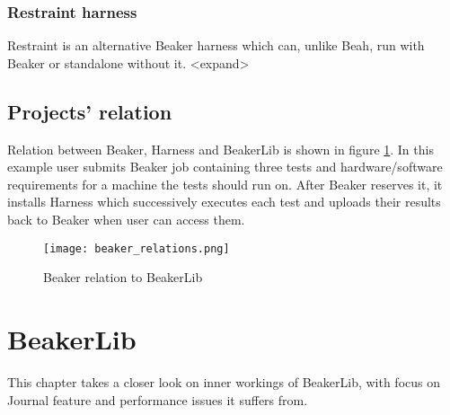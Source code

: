 \subsection{Restraint harness}
Restraint \cite{restraint_doc} is an alternative Beaker harness which can, unlike Beah, run with Beaker or standalone without it. <expand>

\section{Projects' relation}
Relation between Beaker, Harness and BeakerLib is shown in figure \ref{fig:beaker_relation}. In this example user submits Beaker job containing three tests and hardware/software requirements for a machine the tests should run on. After Beaker reserves it, it installs Harness which successively executes each test and uploads their results back to Beaker when user can access them.

\begin{figure}[h!]
  \texttt{[image: beaker\_relations.png]}
  \caption{Beaker relation to BeakerLib}
  \label{fig:beaker_relation}
\end{figure}

\chapter{BeakerLib}
\label{beakerlib_chapter}

This chapter takes a closer look on inner workings of BeakerLib, with focus on Journal feature and performance issues it suffers from.

